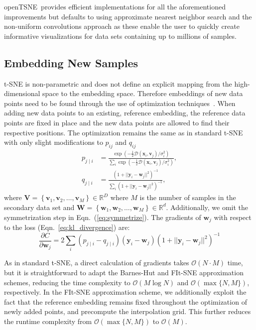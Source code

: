 \documentclass[twocolumn]{bmcart}
\newcommand{\opentsne}{\textsf{openTSNE}}
\begin{document}
\opentsne\ provides efficient implementations for all the aforementioned
improvements but defaults to using approximate nearest neighbor search and the
non-uniform convolutions approach as these enable the user to quickly create
informative visualizations for data sets containing up to millions of samples.

\subsection*{Embedding New Samples}

t-SNE is non-parametric and does not define an explicit mapping from the
high-dimensional space to the embedding space. Therefore embeddings of new data
points need to be found through the use of optimization
techniques~\cite{policar2019embedding}. When adding new data points to an
existing, reference embedding, the reference data points are fixed in place and
the new data points are allowed to find their respective positions. The
optimization remains the same as in standard t-SNE with only slight
modifications to $p_{ij}$ and $q_{ij}$
\begin{align}
p_{j \mid i} &= \frac{\exp \left ( -\frac{1}{2} \mathcal{D}(\mathbf{x}_i, \mathbf{v}_j) /  \sigma_i^2 \right )}{\sum_{i} \exp \left ( -\frac{1}{2} \mathcal{D}(\mathbf{x}_i, \mathbf{v}_j) / \sigma_i^2 \right )}, \\
q_{j \mid i} &= \frac{\left ( 1 + || \mathbf{y}_i - \mathbf{w}_j ||^2 \right )^{-1}}{\sum_{i}\left ( 1 + || \mathbf{y}_i - \mathbf{w}_j ||^2 \right )^{-1}},
\end{align}
\noindent where $\mathbf{V} = \left \{ \mathbf{v}_1, \mathbf{v}_2, \dots,
\mathbf{v}_M \right \} \in \mathbb{R}^D$ where $M$ is the number of samples in
the secondary data set and $\mathbf{W} = \left \{ \mathbf{w}_1, \mathbf{w}_2, \dots,
\mathbf{w}_M \right \} \in \mathbb{R}^d$. Additionally, we omit the
symmetrization step in Eqn.~(\ref{eq:symmetrize}). The gradients of
$\mathbf{w}_j$ with respect to the loss (Eqn.~\ref{eq:kl_divergence}) are:
\begin{equation}
\frac{\partial C}{\partial \mathbf{w}_j} = 2 \sum_i \left ( p_{j \mid i} - q_{j \mid i} \right ) \left ( \mathbf{y}_i - \mathbf{w}_j \right ) \left ( 1 + || \mathbf{y}_i - \mathbf{w}_j || ^2 \right )^{-1}
\label{eq:gradient}
\end{equation}

As in standard t-SNE, a direct calculation of gradients takes $\mathcal{O}(N
\cdot M)$ time, but it is straightforward to adapt the Barnes-Hut and FIt-SNE
approximation schemes, reducing the time complexity to $\mathcal{O}(M \log N)$
and $\mathcal{O}(\max \{ N, M \})$, respectively. In the FIt-SNE approximation
scheme, we additionally exploit the fact that the reference embedding remains
fixed throughout the optimization of newly added points, and precompute the
interpolation grid. This further reduces the runtime complexity from
$\mathcal{O}(\max \{ N, M \})$ to $\mathcal{O}(M)$.
\end{document}
